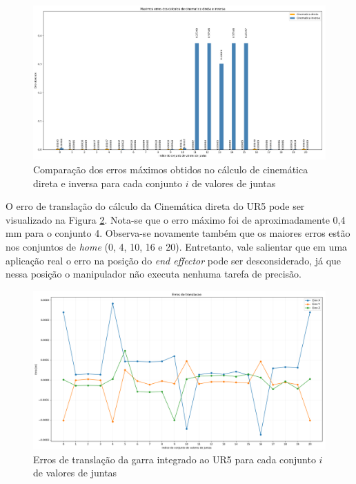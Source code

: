 \begin{figure}[htp]
	\centering
	\caption{Comparação dos erros máximos obtidos no cálculo de cinemática direta e inversa
		para cada conjunto $i$ de valores de juntas
	}
	\label{fig:grafico-maximo-erros}
	\includegraphics[width=\textwidth]{images/maximos_erros.png}
\end{figure}

O erro de translação do cálculo da Cinemática direta do UR5 pode ser visualizado na Figura \ref{fig:grafico-erro-transalacao}.
Nota-se que o erro máximo foi de aproximadamente 0,4 mm para o conjunto 4. Observa-se novamente também que os maiores erros estão nos conjuntos
de \textit{home} (0, 4, 10, 16 e 20). Entretanto, vale salientar que em uma aplicação real o erro na posição do \textit{end effector} pode ser
desconsiderado, já que nessa posição o manipulador não executa nenhuma tarefa de precisão.

\begin{figure}[htp]
	\centering
	\caption{Erros de translação da garra integrado ao UR5 para cada conjunto $i$ de valores de juntas}
	\label{fig:grafico-erro-transalacao}
	\includegraphics[width=\textwidth]{images/erros_de_translacao.png}
\end{figure}

